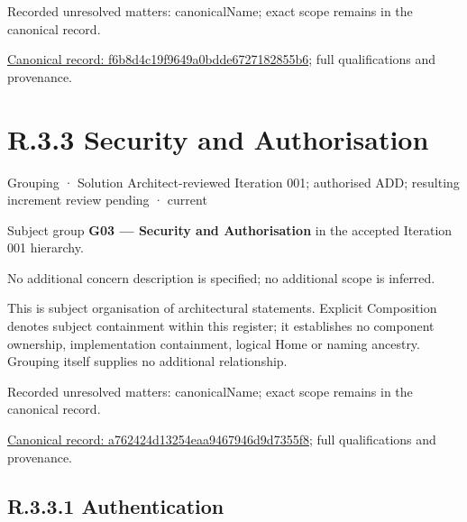 {\small Recorded unresolved matters: canonicalName; exact scope remains in the canonical record.}\par
{\footnotesize \href{../../../../continuum/grouping/f6b8d4c19f9649a0bdde6727182855b6.md}{Canonical record: f6b8d4c19f9649a0bdde6727182855b6}; full qualifications and provenance.}\par
\section*{R.3.3 Security and Authorisation}
\label{navigation:R.3.3}

\label{element:a762424d13254eaa9467946d9d7355f8}
{\small Grouping · Solution Architect-reviewed Iteration 001; authorised ADD; resulting increment review pending · current}\par

Subject group \textbf{G03 — Security and Authorisation} in the accepted Iteration 001 hierarchy.



No additional concern description is specified; no additional scope is inferred.



This is subject organisation of architectural statements. Explicit Composition denotes subject containment within this register; it establishes no component ownership, implementation containment, logical Home or naming ancestry. Grouping itself supplies no additional relationship.


{\small Recorded unresolved matters: canonicalName; exact scope remains in the canonical record.}\par
{\footnotesize \href{../../../../continuum/grouping/a762424d13254eaa9467946d9d7355f8.md}{Canonical record: a762424d13254eaa9467946d9d7355f8}; full qualifications and provenance.}\par
\subsection*{R.3.3.1 Authentication}
\label{navigation:R.3.3.1}

